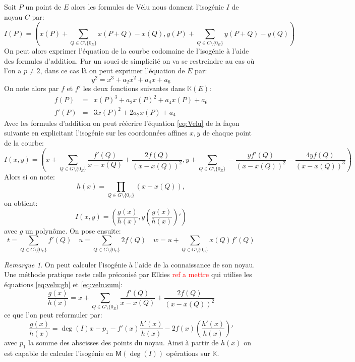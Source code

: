 \documentclass[10pt,a4paper]{book}
\theoremstyle{plain}
\theoremstyle{definition}
\theoremstyle{definition}
\theoremstyle{definition}
\theoremstyle{definition}
\theoremstyle{remark}
\newtheorem{rem}[thm]{Remarque}
\theoremstyle{remark}
\theoremstyle{definition}
\begin{document}
Soit $P$ un point de $E$ alors les formules de Vélu nous donnent l'isogénie $I$ de noyau $C$ par: 
\begin{equation}
\label{eq:Velu}
I(P)= \left( x(P)+\sum_{Q \in C \setminus \{0_E\}} x(P+Q)-x(Q),y(P)+\sum_{Q \in C \setminus \{0_E\}} y(P+Q)-y(Q) \right)
\end{equation} 
On peut alors exprimer l'équation de la courbe codomaine de l'isogénie à l'aide des formules d'addition. Par un souci de simplicité on va se restreindre au cas où l'on a $p \neq 2$, dans ce cas là on peut exprimer l'équation de $E$ par:
\begin{equation*}
y^2=x^3+a_2 x^2 + a_4 x + a_6
\end{equation*}
On note alors par $f$ et $f'$ les deux fonctions suivantes dans $\mathbb{K}(E)$:
\begin{align*}
f(P)&=& x(P)^3+a_2x(P)^2+a_4x(P)+a_6 \\
f'(P)&=& 3x(P)^2+2a_2x(P)+a_4
\end{align*}
Avec les formules d'addition on peut réécrire l'équation \eqref{eq:Velu} de la façon suivante en explicitant l'isogénie sur les coordonnées affines $x,y$ de chaque point de la courbe:
\begin{equation} \label{eq:velu:sum}
I(x,y)=\left( x + \sum_{Q \in G \setminus \{0_E\}} \frac{f'(Q)}{x-x(Q)}+\frac{2f(Q)}{(x-x(Q))^2} , y + \sum_{Q \in G \setminus \{0_E\}} -\frac{yf'(Q)}{(x-x(Q))^2}-\frac{4yf(Q)}{(x-x(Q))^3}  \right)
\end{equation}
Alors si on note: 
\begin{equation*}
h(x)=\prod_{Q \in G \setminus \{0_E\}}(x-x(Q)),
\end{equation*}
on obtient:
\begin{equation} 
\label{eq:velu:gh}
I(x,y)=\left(\frac{g(x)}{h(x)},y\left( \frac{g(x)}{h(x)} \right)'\right)
\end{equation}
avec $g$ un polynôme. On pose ensuite:
\begin{equation*}
t= \sum_{Q \in G \setminus \{0_E\}} f'(Q) \quad u=\sum_{Q \in G \setminus \{0_E\}} 2f(Q) \quad w=u+\sum_{Q \in G \setminus \{0_E\}}x(Q)f'(Q) 
\end{equation*}

\begin{rem}
On peut calculer l'isogénie à l'aide de la connaissance de son noyau. Une méthode pratique reste celle préconisé par Elkies \cite{elkies1998} \textcolor{red}{ref a mettre} qui utilise les équations \eqref{eq:velu:gh} et \eqref{eq:velu:sum}:
\begin{equation*}
\frac{g(x)}{h(x)}= x + \sum_{Q \in G \setminus \{0_E\}} \frac{f'(Q)}{x-x(Q)}+\frac{2f(Q)}{(x-x(Q))^2}
\end{equation*}
ce que l'on peut reformuler par:
\begin{equation}
\frac{g(x)}{h(x)}= \deg(I) x -p_1 - f'(x) \frac{h'(x)}{h(x)} -2f(x)  \left(\frac{h'(x)}{h(x)}\right)'
\end{equation}
avec $p_1$ la somme des abscisses des points du noyau. Ainsi à partir de $h(x)$ on est capable de calculer l'isogénie en $\mathsf{M}(\deg(I))$ opérations sur $\mathbb{K}$.
\end{rem}
\end{document}

